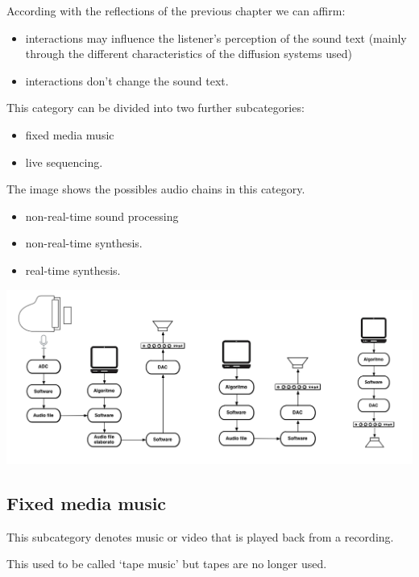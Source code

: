 According with the reflections of the previous chapter we can affirm:

\begin{itemize}
\tightlist
\item interactions may influence the listener's perception of the sound text (mainly through the different characteristics of the diffusion systems used)
\item interactions don't change the sound text.
\end{itemize}

This category can be divided into two further subcategories:

\begin{itemize}
\tightlist
\item fixed media music
\item live sequencing.
\end{itemize}

The image shows the possibles audio chains in this category.

\begin{itemize}
\tightlist
\item non-real-time sound processing
\item non-real-time synthesis.
\item real-time synthesis.
\end{itemize}

\begin{center}
\includegraphics[scale=1]{../img/chains.png}
\end{center}

\subsection{Fixed media music }\label{fixed-media-music}

This subcategory denotes music or video that is played back from a recording.

This used to be called `tape music' but tapes are no longer used.

